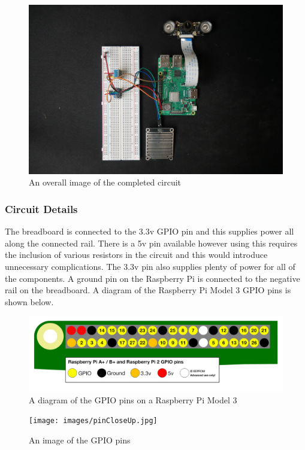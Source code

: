\documentclass[10pt,a4paper]{article}
\begin{document}
\begin{figure}[H]
  \centering
    \includegraphics[width=\linewidth]{images/overView.jpg}
    \caption{An overall image of the completed circuit}
    \label{fig:overView}
\end{figure}

\subsubsection{Circuit Details}
The breadboard is connected to the 3.3v GPIO pin and this supplies power all along the connected rail. There is a 5v pin available however using this requires the inclusion of various resistors in the circuit and this would introduce unnecessary complications. The 3.3v pin also supplies plenty of power for all of the components. A ground pin on the Raspberry Pi is connected to the negative rail on the breadboard. A diagram of the Raspberry Pi Model 3 GPIO pins is shown below. 
\begin{figure}[H]
  \centering
    \includegraphics[width=\linewidth]{images/gpio-pins.png}
    \caption{A diagram of the GPIO pins on a Raspberry Pi Model 3\cite{website:gpiopins}}
    \label{fig:gpiopins}
\end{figure}

\begin{figure}[H]
  \centering
    \texttt{[image: images/pinCloseUp.jpg]}
    \caption{An image of the GPIO pins}
    \label{fig:pinCloseUp}
\end{figure}
\end{document}
